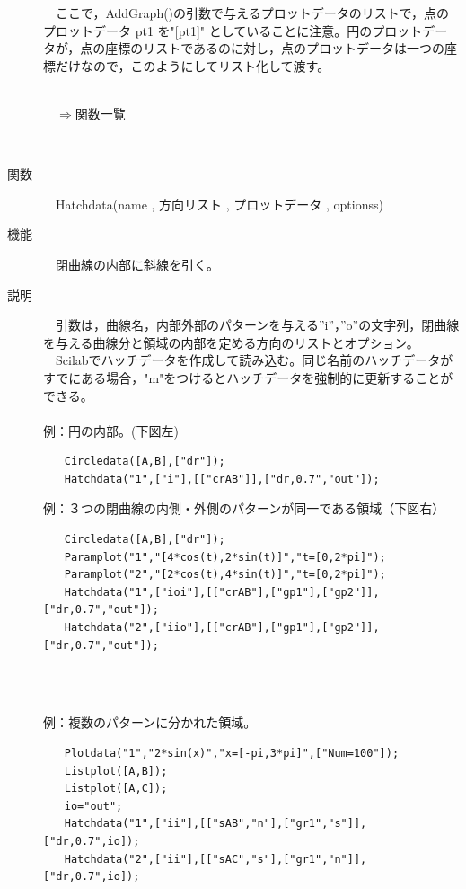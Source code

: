 \documentclass[papersize,a4paper,12pt,uplatex]{jsarticle}
\begin{document}
\begin{description}
\begin{center}

\end{center}
　ここで，AddGraph()の引数で与えるプロットデータのリストで，点のプロットデータ pt1 を"[pt1]" としていることに注意。円のプロットデータが，点の座標のリストであるのに対し，点のプロットデータは一つの座標だけなので，このようにしてリスト化して渡す。\\
　\\
\begin{flushright}　\hyperlink{functionlist}{$\Rightarrow$関数一覧}\end{flushright}
　\\

\hypertarget{hatchdata}{}
\item[関数]　Hatchdata(name , 方向リスト , プロットデータ , optionss)
\item[機能]　閉曲線の内部に斜線を引く。
\item[説明]　引数は，曲線名，内部外部のパターンを与える''i''，''o''の文字列，閉曲線を与える曲線分と領域の内部を定める方向のリストとオプション。\\
　Scilabでハッチデータを作成して読み込む。同じ名前のハッチデータがすでにある場合，"m"をつけるとハッチデータを強制的に更新することができる。\\
　\\
例：円の内部。(下図左)
\begin{verbatim}
　　Circledata([A,B],["dr"]);
　　Hatchdata("1",["i"],[["crAB"]],["dr,0.7","out"]);
\end{verbatim}

例：３つの閉曲線の内側・外側のパターンが同一である領域（下図右）
\begin{verbatim}
　　Circledata([A,B],["dr"]);
　　Paramplot("1","[4*cos(t),2*sin(t)]","t=[0,2*pi]");
　　Paramplot("2","[2*cos(t),4*sin(t)]","t=[0,2*pi]");
　　Hatchdata("1",["ioi"],[["crAB"],["gp1"],["gp2"]],["dr,0.7","out"]);
　　Hatchdata("2",["iio"],[["crAB"],["gp1"],["gp2"]],["dr,0.7","out"]);
\end{verbatim}
　\\
　　 　　
\newpage

例：複数のパターンに分かれた領域。
\begin{verbatim}
　　Plotdata("1","2*sin(x)","x=[-pi,3*pi]",["Num=100"]);
　　Listplot([A,B]);
　　Listplot([A,C]);
　　io="out";
　　Hatchdata("1",["ii"],[["sAB","n"],["gr1","s"]],["dr,0.7",io]);
　　Hatchdata("2",["ii"],[["sAC","s"],["gr1","n"]],["dr,0.7",io]);
\end{verbatim}
\begin{center}

\end{center}


\end{description}
\end{document}
